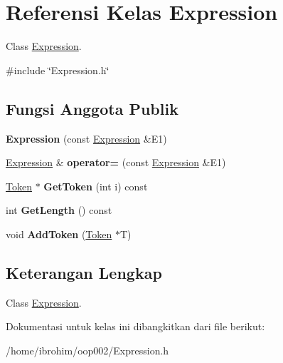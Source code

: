\hypertarget{classExpression}{}\section{Referensi Kelas Expression}
\label{classExpression}


Class \hyperlink{classExpression}{Expression}.  




{\ttfamily \#include \char`\"{}Expression.\+h\char`\"{}}

\subsection*{Fungsi Anggota Publik}
\begin{DoxyCompactItemize}
\item 
\hypertarget{classExpression_adc6727acfb0cd72c184b6471be928e4a}{}{\bfseries Expression} (const \hyperlink{classExpression}{Expression} \&E1)\label{classExpression_adc6727acfb0cd72c184b6471be928e4a}

\item 
\hypertarget{classExpression_a50017a043b96ee516ed2cafad28bb509}{}\hyperlink{classExpression}{Expression} \& {\bfseries operator=} (const \hyperlink{classExpression}{Expression} \&E1)\label{classExpression_a50017a043b96ee516ed2cafad28bb509}

\item 
\hypertarget{classExpression_a8aff19bc0d16007c40ade71664771e4d}{}\hyperlink{classToken}{Token} $\ast$ {\bfseries Get\+Token} (int i) const \label{classExpression_a8aff19bc0d16007c40ade71664771e4d}

\item 
\hypertarget{classExpression_a0fc88810ca770214d6d221ad711133dd}{}int {\bfseries Get\+Length} () const \label{classExpression_a0fc88810ca770214d6d221ad711133dd}

\item 
\hypertarget{classExpression_a5e3c9fe32872a5c4a13b1188b024d151}{}void {\bfseries Add\+Token} (\hyperlink{classToken}{Token} $\ast$T)\label{classExpression_a5e3c9fe32872a5c4a13b1188b024d151}

\end{DoxyCompactItemize}


\subsection{Keterangan Lengkap}
Class \hyperlink{classExpression}{Expression}. 

Dokumentasi untuk kelas ini dibangkitkan dari file berikut\+:\begin{DoxyCompactItemize}
\item 
/home/ibrohim/oop002/Expression.\+h\end{DoxyCompactItemize}
